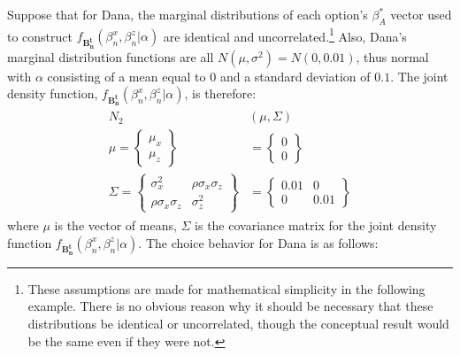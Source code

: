 \documentclass[../main.tex]{subfiles}
\begin{document}
Suppose that for Dana, the marginal distributions of each option's $\beta_A^*$ vector used to construct $f_{\mathbf{B_n^t}}(\beta_n^ x,\beta_n^ z|\alpha)$ are identical and uncorrelated.\footnote{
	These assumptions are made for mathematical simplicity in the following example.
	There is no obvious reason why it should be necessary that these distributions be identical or uncorrelated, though the conceptual result would be the same even if they were not.
} 
Also, Dana's marginal distribution functions are all $N(\mu,\sigma^2) = N(0,0.01)$, thus normal with $\alpha$ consisting of a mean equal to $0$ and a standard deviation of $0.1$.
The joint density function, $f_{\mathbf{B_n^t}}(\beta_n^x,\beta_n^z|\alpha)$, is therefore:
\begin{align}
	\begin{split}
		N_2&(\mu,\Sigma) \\
		\mu =\begin{Bmatrix}\mu_x \\ \mu_z\end{Bmatrix} &= \begin{Bmatrix}0\\0\end{Bmatrix}\\
		\Sigma =\begin{Bmatrix} \sigma_x^2 & \rho\sigma_x\sigma_z \\  \rho\sigma_x\sigma_z & \sigma_z^2 \end{Bmatrix} &=
	\begin{Bmatrix} 0.01 & 0 \\  0 & 0.01 \end{Bmatrix}
	\end{split}
\end{align}
\noindent where $\mu$ is the vector of means, $\Sigma$ is the covariance matrix for the joint density function $f_{\mathbf{B_n^t}}(\beta_n^x,\beta_n^z|\alpha)$.
The choice behavior for Dana is as follows:
\end{document}
